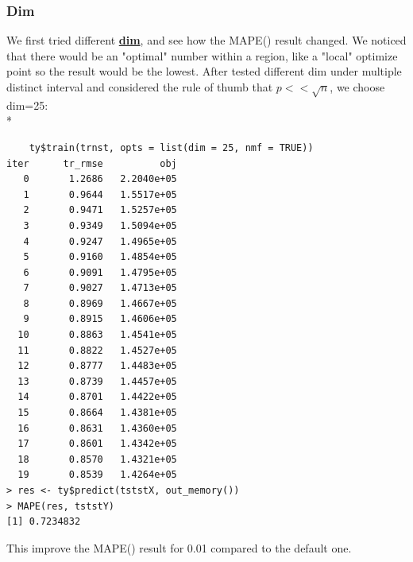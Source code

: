 \documentclass[11pt]{article}
\newcommand\tab[1][0.5cm]{\hspace*{#1}}
\begin{document}
\subsubsection{Dim}
\tab{}We first tried different \textbf{\underline{dim}}, and see how the MAPE() result changed. We noticed that there would be an "optimal" number within a region, like a "local" optimize point so the result would be the lowest. After tested different dim under multiple distinct interval and considered the rule of thumb that $p << \sqrt{n}$, we choose dim=25:
\\*
\begin{verbatim}
    ty$train(trnst, opts = list(dim = 25, nmf = TRUE))
iter      tr_rmse          obj
   0       1.2686   2.2040e+05
   1       0.9644   1.5517e+05
   2       0.9471   1.5257e+05
   3       0.9349   1.5094e+05
   4       0.9247   1.4965e+05
   5       0.9160   1.4854e+05
   6       0.9091   1.4795e+05
   7       0.9027   1.4713e+05
   8       0.8969   1.4667e+05
   9       0.8915   1.4606e+05
  10       0.8863   1.4541e+05
  11       0.8822   1.4527e+05
  12       0.8777   1.4483e+05
  13       0.8739   1.4457e+05
  14       0.8701   1.4422e+05
  15       0.8664   1.4381e+05
  16       0.8631   1.4360e+05
  17       0.8601   1.4342e+05
  18       0.8570   1.4321e+05
  19       0.8539   1.4264e+05
> res <- ty$predict(tststX, out_memory())
> MAPE(res, tststY)
[1] 0.7234832
\end{verbatim}
This improve the MAPE() result for 0.01 compared to the default one.
\end{document}
